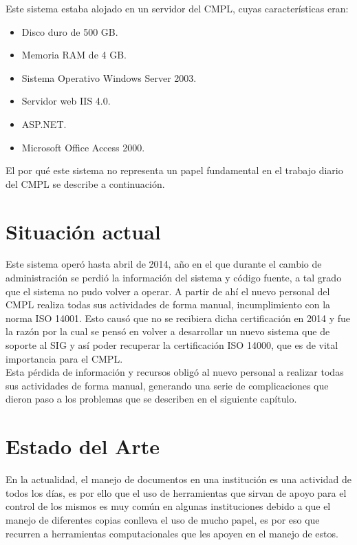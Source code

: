 	Este sistema estaba alojado en un servidor del CMPL, cuyas características eran:
	
	\begin{itemize}
		\item Disco duro de 500 GB.
		\item Memoria RAM de 4 GB.
		\item Sistema Operativo Windows Server 2003.
		\item Servidor web IIS 4.0.
		\item ASP.NET.
		\item Microsoft Office Access 2000.
	\end{itemize}
	
	El por qué este sistema no representa un papel fundamental en el trabajo diario del CMPL se describe a continuación.
		
	\section{Situación actual}
	Este sistema operó hasta abril de 2014, año en el que durante el cambio de administración se perdió la información del sistema y código fuente, a  tal grado que el sistema no pudo volver a operar. A partir de ahí el nuevo personal del CMPL realiza todas sus actividades de forma manual, incumplimiento con la norma ISO 14001. Esto causó que no se recibiera dicha certificación en 2014 y fue la razón por la cual se pensó en volver a desarrollar un nuevo sistema que de soporte al SIG y así poder recuperar la certificación ISO 14000, que es de vital importancia para el CMPL.\\
	
	Esta pérdida de información y recursos obligó al nuevo personal a realizar todas sus actividades de forma manual, generando una serie de complicaciones que dieron paso a los problemas que se describen en el siguiente capítulo.\\
	
	\section{Estado del Arte}
	
	En la actualidad, el manejo de documentos en una institución es una actividad de todos los días, es por ello que el uso de herramientas que sirvan de apoyo para el control de los mismos es muy común en algunas instituciones debido a que el manejo de diferentes copias conlleva el uso de mucho papel, es por eso que recurren a herramientas computacionales que les apoyen en el manejo de estos. \\
	

